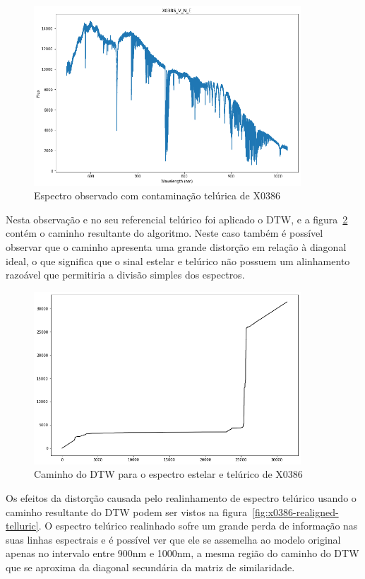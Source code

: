 \begin{figure}[htb]
\centering
\includegraphics[width=10cm]{figuras/x0386_v_n_e_spectrum.png}
\caption{Espectro observado com contaminação telúrica de X0386}
\label{fig:x0386-v-n-e}
\end{figure}

Nesta observação e no seu referencial telúrico foi aplicado o DTW, e a figura~\ref{fig:x0386-warp-path} contém o caminho resultante do algoritmo. Neste caso também é possível observar que o caminho apresenta uma grande distorção em relação à diagonal ideal, o que significa que o sinal estelar e telúrico não possuem um alinhamento razoável que permitiria a divisão simples dos espectros.

\begin{figure}[htb]
\centering
\includegraphics[width=10cm]{figuras/x0386_warp_path.png}
\caption{Caminho do DTW para o espectro estelar e telúrico de X0386}
\label{fig:x0386-warp-path}
\end{figure}

Os efeitos da distorção causada pelo realinhamento de espectro telúrico usando o caminho resultante do DTW podem ser vistos na figura~\ref{fig:x0386-realigned-telluric}. O espectro telúrico realinhado sofre um grande perda de informação nas suas linhas espectrais e é possível ver que ele se assemelha ao modelo original apenas no intervalo entre 900nm e 1000nm, a mesma região do caminho do DTW que se aproxima da diagonal secundária da matriz de similaridade.

